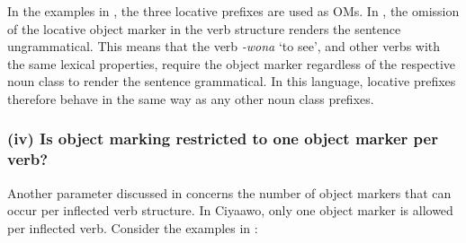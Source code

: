 \documentclass[output=paper]{langscibook}
\begin{document}
\z
\ex\label{ex:ngunga:53}


\z
\z

In the examples in , the three locative prefixes are used as OMs. In , the omission of the locative object marker in the verb structure renders the sentence ungrammatical. This means that the verb \textit{{}-wona} ‘to see’, and other verbs with the same lexical properties, require the object marker regardless of the respective noun class to render the sentence grammatical. In this language, locative prefixes therefore behave in the same way as any other noun class prefixes.

\subsubsection{(iv) Is object marking restricted to one object marker per verb?}

Another parameter discussed in \citet{MartenKula2012} concerns the number of object markers that can occur per inflected verb structure. In Ciyaawo, only one object marker is allowed per inflected verb. Consider the examples in :
\end{document}
